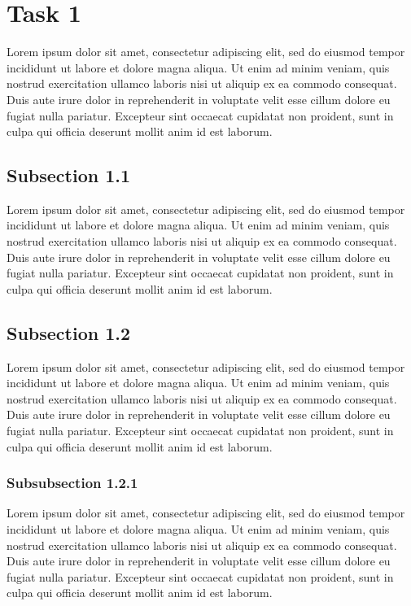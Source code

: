 \section{Task 1}

Lorem ipsum dolor sit amet, consectetur adipiscing elit, sed do eiusmod tempor incididunt ut labore et dolore magna aliqua. Ut enim ad minim veniam, quis nostrud exercitation ullamco laboris nisi ut aliquip ex ea commodo consequat. Duis aute irure dolor in reprehenderit in voluptate velit esse cillum dolore eu fugiat nulla pariatur. Excepteur sint occaecat cupidatat non proident, sunt in culpa qui officia deserunt mollit anim id est laborum.

\subsection{Subsection 1.1}

Lorem ipsum dolor sit amet, consectetur adipiscing elit, sed do eiusmod tempor incididunt ut labore et dolore magna aliqua. Ut enim ad minim veniam, quis nostrud exercitation ullamco laboris nisi ut aliquip ex ea commodo consequat. Duis aute irure dolor in reprehenderit in voluptate velit esse cillum dolore eu fugiat nulla pariatur. Excepteur sint occaecat cupidatat non proident, sunt in culpa qui officia deserunt mollit anim id est laborum.

\subsection{Subsection 1.2}

Lorem ipsum dolor sit amet, consectetur adipiscing elit, sed do eiusmod tempor incididunt ut labore et dolore magna aliqua. Ut enim ad minim veniam, quis nostrud exercitation ullamco laboris nisi ut aliquip ex ea commodo consequat. Duis aute irure dolor in reprehenderit in voluptate velit esse cillum dolore eu fugiat nulla pariatur. Excepteur sint occaecat cupidatat non proident, sunt in culpa qui officia deserunt mollit anim id est laborum.

\subsubsection{Subsubsection 1.2.1}

Lorem ipsum dolor sit amet, consectetur adipiscing elit, sed do eiusmod tempor incididunt ut labore et dolore magna aliqua. Ut enim ad minim veniam, quis nostrud exercitation ullamco laboris nisi ut aliquip ex ea commodo consequat. Duis aute irure dolor in reprehenderit in voluptate velit esse cillum dolore eu fugiat nulla pariatur. Excepteur sint occaecat cupidatat non proident, sunt in culpa qui officia deserunt mollit anim id est laborum.

